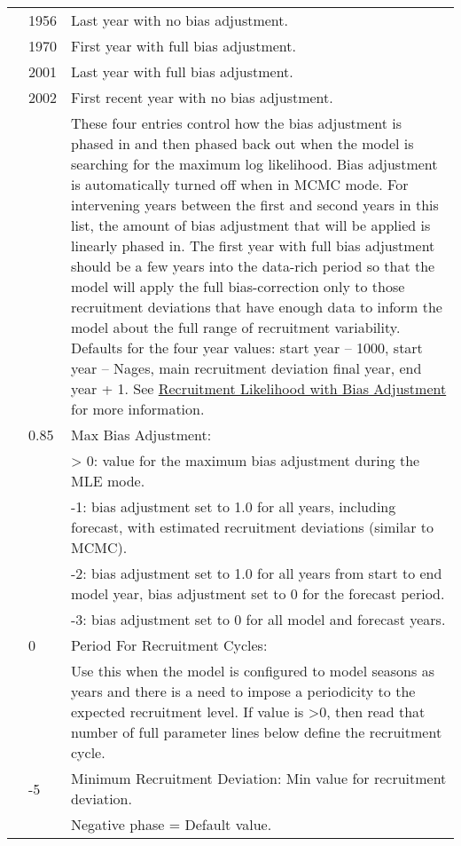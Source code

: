 \begin{longtable}{p{1cm} p{3cm} p{11cm}}
	\Tstrut & 1956 & Last year with no bias adjustment. \\
			& 1970 & First year with full bias adjustment. \\
			& 2001 & Last year with full bias adjustment. \\
			& 2002 & First recent year with no bias adjustment. \\
			&      & These four entries control how the bias adjustment is phased in and then phased back out when the model is searching for the maximum log likelihood.  Bias adjustment is automatically turned off when in MCMC mode.  For intervening years between the first and second years in this list, the amount of bias adjustment that will be applied is linearly phased in.  The first year with full bias adjustment should be a few years into the data-rich period so that the model will apply the full bias-correction only to those recruitment deviations that have enough data to inform the model about the full range of recruitment variability.  Defaults for the four year values: start year – 1000, start year – Nages, main recruitment deviation final year, end year + 1. See \hyperlink{RecBias}{Recruitment Likelihood with Bias Adjustment} for more information.\\
	
	\Tstrut & 0.85 & Max Bias Adjustment: \\
			&      & > 0: value for the maximum bias adjustment during the MLE mode. \\
			& 	   & -1: bias adjustment set to 1.0 for all years, including forecast, with estimated recruitment deviations (similar to MCMC).\\
			& 	   & -2: bias adjustment set to 1.0 for all years from start to end model year, bias adjustment set to 0 for the forecast period. \\
			& 	   & -3: bias adjustment set to 0 for all model and forecast years.\\

	\Tstrut & 0    & Period For Recruitment Cycles: \\
			&      & Use this when the model is configured to model seasons as years and there is a need to impose a periodicity to the expected recruitment level.  If value is >0, then read that number of full parameter lines below define the recruitment cycle. \\
	
	\Tstrut & -5   & Minimum Recruitment Deviation: Min value for recruitment deviation.\\
			&      & Negative phase = Default value.\\


\end{longtable}
